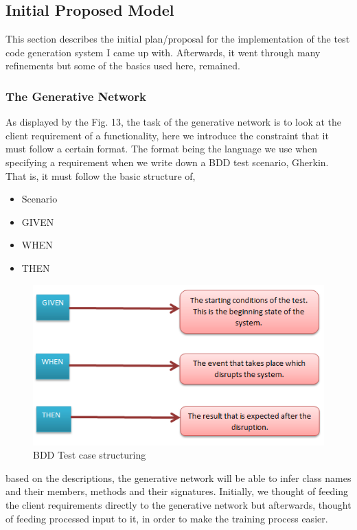\documentclass[conference, onecolumn, a4, 12pt]{IEEEtran}
\begin{document}
\subsection{Initial Proposed Model}
This section describes the initial plan/proposal for the implementation of the test code generation system I came up with. Afterwards, it went through many refinements but some of the basics used here, remained.

\subsubsection{The Generative Network}
As displayed by the Fig. 13, the task of the generative network is to look at the client requirement of a functionality, here we introduce the constraint that it must follow a certain format. The format being the language we use when specifying a requirement when we write down a BDD test scenario, Gherkin. That is, it must follow the basic structure of,

\begin{itemize}
	\item Scenario
	\item GIVEN
	\item WHEN
	\item THEN
\end{itemize}

\begin{figure}
	\includegraphics[width=\linewidth]{Given_when_then.png}
	\caption{BDD Test case structuring}
	\label{fig3}
\end{figure}

based on the descriptions, the generative network will be able to infer class names and their members, methods and their signatures. Initially, we thought of feeding the client requirements directly to the generative network but afterwards, thought of feeding processed input to it, in order to make the training process easier.
\end{document}

